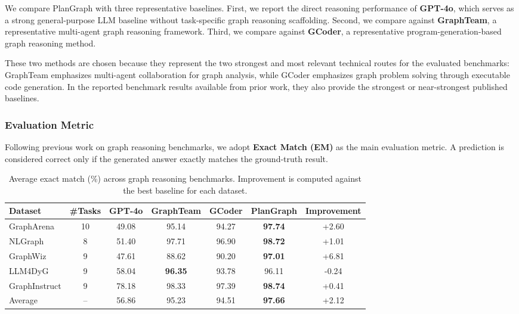 \documentclass[sigconf,review,anonymous]{acmart}
\begin{document}
We compare PlanGraph with three representative baselines.
First, we report the direct reasoning performance of
\textbf{GPT-4o}, which serves as a strong general-purpose LLM
baseline without task-specific graph reasoning scaffolding.
Second, we compare against \textbf{GraphTeam}, a representative
multi-agent graph reasoning framework. Third, we compare against
\textbf{GCoder}, a representative program-generation-based graph
reasoning method.

These two methods are chosen because they represent the two
strongest and most relevant technical routes for the evaluated
benchmarks: GraphTeam emphasizes multi-agent collaboration for
graph analysis, while GCoder emphasizes graph problem solving
through executable code generation. In the reported benchmark
results available from prior work, they also provide the strongest
or near-strongest published baselines.


\subsubsection{Evaluation Metric}

Following previous work on graph reasoning benchmarks,
we adopt \textbf{Exact Match (EM)} as the main evaluation metric.
A prediction is considered correct only if the generated
answer exactly matches the ground-truth result.


\begin{table}[t]
\centering
\caption{Average exact match (\%) across graph reasoning benchmarks. 
Improvement is computed against the best baseline for each dataset.}

\setlength{\tabcolsep}{10pt}
\renewcommand{\arraystretch}{1.2}

\begin{tabular}{lcccccc}
\toprule
Dataset & \#Tasks & GPT-4o & GraphTeam & GCoder & PlanGraph & Improvement \\
\midrule
GraphArena & 10 & 49.08 & 95.14 & 94.27 & \textbf{97.74} & +2.60 \\
NLGraph & 8 & 51.40 & 97.71 & 96.90 & \textbf{98.72} & +1.01 \\
GraphWiz & 9 & 47.61 & 88.62 & 90.20 & \textbf{97.01} & +6.81 \\
LLM4DyG & 9 & 58.04 & \textbf{96.35} & 93.78 & 96.11 & -0.24 \\
GraphInstruct & 9 & 78.18 & 98.33 & 97.39 & \textbf{98.74} & +0.41 \\
\midrule
Average & -- & 56.86 & 95.23 & 94.51 & \textbf{97.66} & +2.12 \\
\bottomrule
\end{tabular}

\label{tab:overall}
\end{table}
\end{document}
